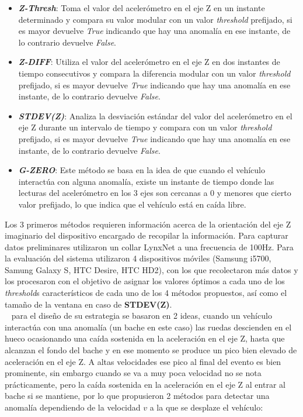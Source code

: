 \begin{itemize}
	\item  \emph{\textbf {Z-Thresh}}: Toma el valor del acelerómetro en el eje Z en un instante determinado y compara su valor modular con 
	un valor \emph{threshold} prefijado, si es mayor devuelve \emph{True} indicando que hay una anomalía en ese instante, de lo contrario
	devuelve \emph{False}.\\
	\item \emph{\textbf {Z-DIFF}}: Utiliza el valor del acelerómetro en el eje Z en dos instantes de tiempo consecutivos y compara la
		diferencia modular con un valor \emph{threshold} prefijado, si es mayor devuelve \emph{True} indicando que hay una anomalía en ese
		instante, de lo contrario devuelve \emph{False}.\\
	\item \emph{\textbf {STDEV(Z)}}: Analiza la desviación estándar del valor del acelerómetro en el eje Z durante un intervalo de
		tiempo y compara con un valor \emph{threshold} prefijado, si es mayor devuelve \emph{True} indicando que hay una anomalía en ese
		instante, de lo contrario devuelve \emph{False}.\\ 
	\item \emph{\textbf {G-ZERO}}: Este método se basa en la idea de que cuando el vehículo interactúa con alguna anomalía, existe un
		instante de tiempo donde las lecturas del acelerómetro en los 3 ejes son cercanas a 0 y menores que cierto valor prefijado, lo que
		indica que el vehículo está en caída libre.\\
\end{itemize}

Los 3 primeros métodos requieren información acerca de la orientación del eje Z imaginario del dispositivo encargado de recopilar la información. 
Para capturar datos preliminares utilizaron un collar LynxNet a una frecuencia de 100Hz. Para la evaluación del sistema utilizaron 4 dispositivos
móviles (Samsung i5700, Samung Galaxy S, HTC Desire, HTC HD2), con los que recolectaron más datos y los procesaron con el objetivo de asignar los 
valores óptimos a cada uno de los \emph{threshold}s característicos de cada uno de los 4 métodos propuestos, así como el tamaño de la ventana en caso de 
\textbf {STDEV(Z)}.\\

~\parencite{mohan2008nericell} para el diseño de su estrategia se basaron en 2 ideas, cuando un vehículo interactúa con una
anomalía (un bache en este caso) las ruedas descienden en el hueco ocasionando una caída sostenida en la aceleración en el eje Z,
hasta que alcanzan el fondo del bache y en ese momento se produce un pico bien elevado de aceleración en el eje Z. A altas velocidades
ese pico al final del evento es bien prominente, sin embargo cuando se va a muy poca velocidad no se nota prácticamente, pero la caída
sostenida en la aceleración en el eje Z al entrar al bache si se mantiene, por lo que propusieron 2 métodos para detectar una anomalía
dependiendo de la velocidad $v$ a la que se desplaze el vehículo:\\

